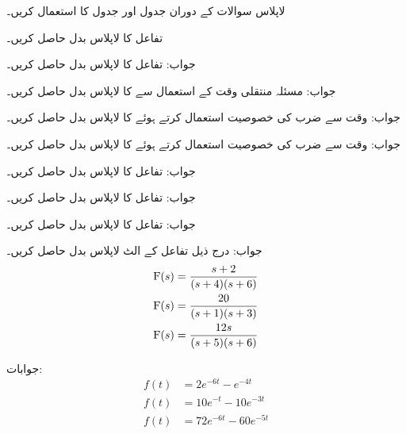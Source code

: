 
لاپلاس سوالات کے دوران جدول  اور جدول  کا استعمال کریں۔

تفاعل  کا لاپلاس بدل حاصل کریں۔

جواب:
تفاعل  کا لاپلاس بدل حاصل کریں۔

جواب:
مسئلہ منتقلی وقت کے استعمال سے  کا لاپلاس بدل حاصل کریں۔

جواب:
وقت سے ضرب کی خصوصیت استعمال کرتے ہوئے   کا لاپلاس بدل حاصل کریں۔

جواب:
وقت سے ضرب کی خصوصیت استعمال کرتے ہوئے   کا لاپلاس بدل حاصل کریں۔

جواب:
تفاعل  کا لاپلاس بدل حاصل کریں۔

جواب:
تفاعل  کا لاپلاس بدل حاصل کریں۔

جواب:
تفاعل  کا لاپلاس بدل حاصل کریں۔

جواب:
درج ذیل تفاعل کے الٹ لاپلاس بدل حاصل کریں۔
\begin{align*}
{\ensuremath{{\textup{F}}}}(s)&=\frac{s+2}{(s+4)(s+6)}\\
{{\textup{F}}}(s)&=\frac{20}{(s+1)(s+3)}\\
{{\textup{F}}}(s)&=\frac{12s}{(s+5)(s+6)}
\end{align*}

جوابات:
\begin{align*}
f(t)&=2e^{-6t}-e^{-4t}\\
f(t)&=10e^{-t}-10e^{-3t}\\
f(t)&=72e^{-6t}-60e^{-5t}
\end{align*}

